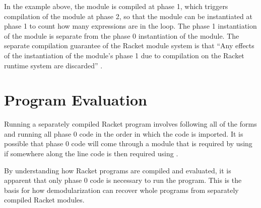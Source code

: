 In the example above, the  module is compiled at phase 1, which triggers compilation of the  module at phase 2, so that the  module can be instantiated at phase 1 to count how many expressions are in the  loop.
The phase 1 instantiation of the  module is separate from the phase 0 instantiation of the module.
The separate compilation guarantee of the Racket module system is that ``Any effects of the instantiation of the module's phase 1 due to compilation on the Racket runtime system are discarded'' \cite{sep}. 

\section{Program Evaluation}
Running a separately compiled Racket program involves following all of the  forms and running all phase 0 code in the order in which the code is imported.
It is possible that phase 0 code will come through a module that is required by using  if somewhere along the line code is then required using .

By understanding how Racket programs are compiled and evaluated, it is apparent that only phase 0 code is necessary to run the program. 
This is the basis for how demodularization can recover whole programs from separately compiled Racket modules. 
